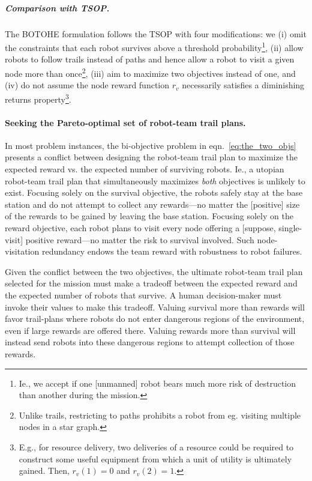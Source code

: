 \documentclass[11pt, oneside]{article}
\begin{document}
\subparagraph{Comparison with TSOP.}
The BOTOHE formulation follows the TSOP \cite{jorgensen2018team} with four modifications: we (i) omit the constraints that each robot survives above a threshold probability\footnote{Ie., we accept if one [unmanned] robot bears much more risk of destruction than another during the mission.}, (ii) allow robots to follow trails instead of paths and hence allow a robot to visit a given node more than once\footnote{Unlike trails, restricting to paths prohibits a robot from eg. visiting multiple nodes in a star graph.}, (iii) aim to maximize two objectives instead of one, and (iv) do not assume the node reward function $r_v$ necessarily satisfies a diminishing returns property\footnote{E.g., for resource delivery, two deliveries of a resource could be required to construct some useful equipment from which a unit of utility is ultimately gained. Then, $r_v(1)=0$ and $r_v(2)=1$.
}.




\paragraph{Seeking the Pareto-optimal set of robot-team trail plans.} 
In most problem instances, the bi-objective problem in eqn.~\ref{eq:the_two_objs} presents a conflict between designing the robot-team trail plan to maximize the expected reward vs. the expected number of surviving robots. Ie., a utopian robot-team trail plan that simultaneously maximizes \emph{both} objectives is unlikely to exist.
Focusing solely on the survival objective, the robots safely stay at the base station and do not attempt to collect any rewards---no matter the [positive] size of the rewards to be gained by leaving the base station. 
Focusing solely on the reward objective, each robot plans to visit every node offering a [suppose, single-visit] positive reward---no matter the risk to survival involved. Such node-visitation redundancy endows the team reward with robustness to robot failures.

Given the conflict between the two objectives, the ultimate robot-team trail plan selected for the mission must make a tradeoff between the expected reward and the expected number of robots that survive. 
A human decision-maker must invoke their values to make this tradeoff.
Valuing survival more than rewards will favor trail-plans where robots do not enter dangerous regions of the environment, even if large rewards are offered there. 
Valuing rewards more than survival will instead send robots into these dangerous regions to attempt collection of those rewards. 
\end{document}
